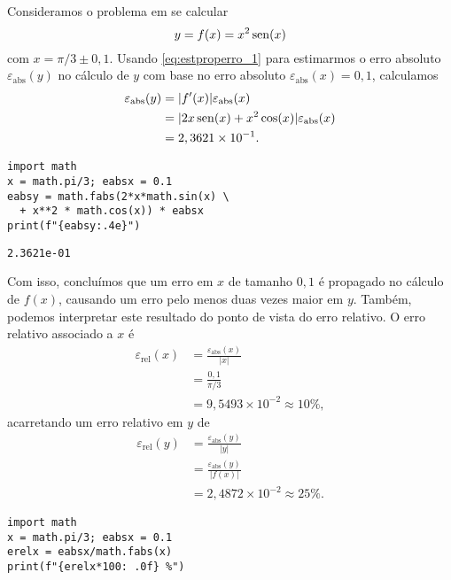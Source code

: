 \begin{ex}\label{ex:properro_1}
  Consideramos o problema em se calcular
  \begin{equation}
    y = f(x) = x^2\operatorname{sen}(x)
  \end{equation}
  com $x=\pi/3 \pm 0,1$. Usando \eqref{eq:estproperro_1} para estimarmos o erro absoluto $\varepsilon_{\text{abs}}(y)$ no cálculo de $y$ com base no erro absoluto $\varepsilon_{\text{abs}}(x)=0,1$, calculamos
  \begin{align}
    \varepsilon_{\text{abs}}(y) &= |f'(x)|\varepsilon_{\text{abs}}(x)\\
             &= |2x\operatorname{sen}(x) + x^2\cos(x)|\varepsilon_{\text{abs}}(x)\\
             &= 2,3621\times 10^{-1}.
  \end{align}

  
\begin{lstlisting}
import math
x = math.pi/3; eabsx = 0.1
eabsy = math.fabs(2*x*math.sin(x) \
  + x**2 * math.cos(x)) * eabsx
print(f"{eabsy:.4e}")
\end{lstlisting}

\begin{verbatim}
2.3621e-01
\end{verbatim}
  
  Com isso, concluímos que um erro em $x$ de tamanho $0,1$ é propagado no cálculo de $f(x)$, causando um erro pelo menos duas vezes maior em $y$. Também, podemos interpretar este resultado do ponto de vista do erro relativo. O erro relativo associado a $x$ é
  \begin{align}
    \varepsilon_{\text{rel}}(x) &= \frac{\varepsilon_{\text{abs}}(x)}{|x|}\\
                                &= \frac{0,1}{\pi/3}\\
                                &= 9,5493\times 10^{-2} \approx 10\%,
  \end{align}
  acarretando um erro relativo em $y$ de
  \begin{align}
    \varepsilon_{\text{rel}}(y) &= \frac{\varepsilon_{\text{abs}}(y)}{|y|}\\
                                &= \frac{\varepsilon_{\text{abs}}(y)}{|f(x)|} \\
                                &= 2,4872\times 10^{-2} \approx 25\%.
  \end{align}

  
\begin{lstlisting}
import math
x = math.pi/3; eabsx = 0.1
erelx = eabsx/math.fabs(x)
print(f"{erelx*100: .0f} %")
\end{lstlisting}


\end{ex}
